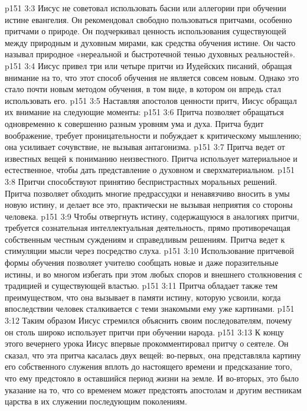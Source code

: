 \vs p151 3:3 \bibnobreakspace Иисус не советовал использовать басни или аллегории при обучении истине евангелия. Он рекомендовал свободно пользоваться притчами, особенно притчами о природе. Он подчеркивал ценность использования  существующей между природным и духовным мирами, как средства обучения истине. Он часто называл природное «нереальной и быстротечной тенью духовных реальностей».
\vs p151 3:4 \pc {}\bibnobreakspace Иисус привел три или четыре притчи из Иудейских писаний, обращая внимание на то, что этот способ обучения не является совсем новым. Однако это стало почти новым методом обучения, в том виде, в котором он впредь стал использовать его.
\vs p151 3:5 \pc {}\bibnobreakspace Наставляя апостолов ценности притч, Иисус обращал их внимание на следующие моменты:
\vs p151 3:6 Притча позволяет обращаться одновременно к совершенно разным уровням ума и духа. Притча будит воображение, требует проницательности и побуждает к критическому мышлению; она усиливает сочувствие, не вызывая антагонизма.
\vs p151 3:7 Притча ведет от известных вещей к пониманию неизвестного. Притча использует материальное и естественное, чтобы дать представление о духовном и сверхматериальном.
\vs p151 3:8 Притчи способствуют принятию беспристрастных моральных решений. Притча позволяет обходить многие предрассудки и ненавязчиво вносить в умы новую истину, и делает все это, практически не вызывая неприятия со стороны человека.
\vs p151 3:9 Чтобы отвергнуть истину, содержащуюся в аналогиях притчи, требуется сознательная интеллектуальная деятельность, прямо противоречащая собственным честным суждениям и справедливым решениям. Притча ведет к стимуляции мысли через посредство слуха.
\vs p151 3:10 Использование притчевой формы обучения позволяет учителю сообщать новые и даже поразительные истины, и во многом избегать при этом любых споров и внешнего столкновения с традицией и существующей властью.
\vs p151 3:11 Притча обладает также тем преимуществом, что она вызывает в памяти истину, которую усвоили, когда впоследствии человек сталкивается с теми знакомыми ему уже картинами.
\vs p151 3:12 \pc Таким образом Иисус стремился объяснить своим последователям, почему он столь широко использует притчи при обучении народа.
\vs p151 3:13 \pc К концу этого вечернего урока Иисус впервые прокомментировал притчу о сеятеле. Он сказал, что эта притча касалась двух вещей: во\hyp{}первых, она представляла картину его собственного служения вплоть до настоящего времени и предсказание того, что ему предстояло в оставшийся период жизни на земле. И во\hyp{}вторых, это было указание на то, что со временем может предстоять апостолам и другим вестникам царства в их служении последующим поколениям.
